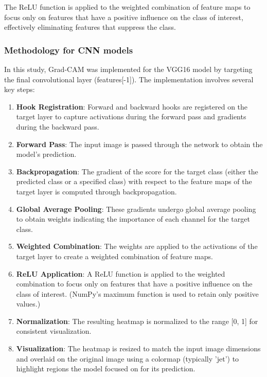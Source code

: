 \documentclass[a4paper,12pt]{report}
\begin{document}
The ReLU function is applied to the weighted combination of feature maps to focus only on features that have a positive influence on the class of interest, effectively eliminating features that suppress the class.

\subsubsection{Methodology for CNN models}

In this study, Grad-CAM was implemented for the VGG16 model by targeting the final convolutional layer (features[-1]). The implementation involves several key steps:

\begin{enumerate}
    \item \textbf{Hook Registration}: Forward and backward hooks are registered on the target layer to capture activations during the forward pass and gradients during the backward pass.
    
    \item \textbf{Forward Pass}: The input image is passed through the network to obtain the model's prediction.
    
    \item \textbf{Backpropagation}: The gradient of the score for the target class (either the predicted class or a specified class) with respect to the feature maps of the target layer is computed through backpropagation.
    
    \item \textbf{Global Average Pooling}: These gradients undergo global average pooling to obtain weights indicating the importance of each channel for the target class.
    
    \item \textbf{Weighted Combination}: The weights are applied to the activations of the target layer to create a weighted combination of feature maps.
    
    \item \textbf{ReLU Application}: A ReLU function is applied to the weighted combination to focus only on features that have a positive influence on the class of interest. (NumPy's maximum function is used to retain only positive values.)
    
    \item \textbf{Normalization}: The resulting heatmap is normalized to the range [0, 1] for consistent visualization.
    
    \item \textbf{Visualization}: The heatmap is resized to match the input image dimensions and overlaid on the original image using a colormap (typically 'jet') to highlight regions the model focused on for its prediction.
\end{enumerate}
\end{document}
